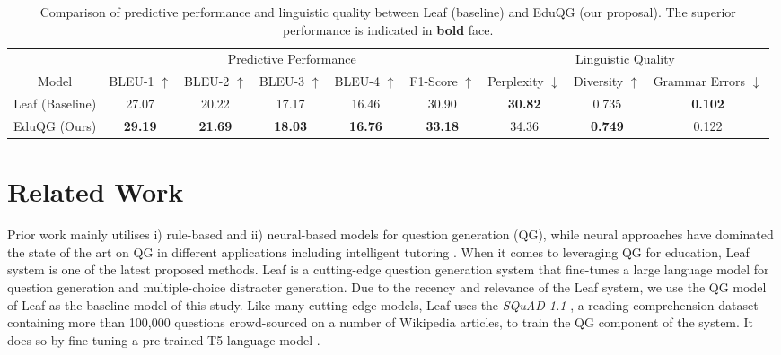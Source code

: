 \documentclass[letterpaper]{article} %
\begin{document}
\begin{table}[t!] \centering \small
\begin{tabular}{c|ccccc|ccc}
\hline
                & \multicolumn{5}{c}{Predictive Performance}                          & \multicolumn{3}{c}{Linguistic Quality}       \\
Model           & BLEU-1 $\uparrow$     & BLEU-2 $\uparrow$     & BLEU-3 $\uparrow$     & BLEU-4   $\uparrow$   & F1-Score  $\uparrow$        & Perplexity $\downarrow$       & Diversity $\uparrow$         & Grammar Errors $\downarrow$        \\

\hline
Leaf (Baseline) & 27.07          & 20.22          & 17.17          & {16.46} & 30.90          & \textbf{30.82} & 0.735          & \textbf{0.102} \\
EduQG (Ours)        & \textbf{29.19} & \textbf{21.69} & \textbf{18.03} & \textbf{16.76} & \textbf{33.18} & 34.36          & \textbf{0.749} & 0.122  \\       
\hline
\end{tabular}
\caption{Comparison of predictive performance and linguistic quality between Leaf (baseline) and EduQG (our proposal). The superior performance is indicated in \textbf{bold} face.}
\label{results}
\end{table}
\section{Related Work}

Prior work mainly utilises i) rule-based and ii) neural-based models for question generation (QG), while neural approaches have dominated the state of the art on QG in different applications including intelligent tutoring \cite{zhang2021review}. 
When it comes to leveraging QG for education, Leaf system \cite{vachev2022leaf} is one of the latest proposed methods.
Leaf is a cutting-edge question generation system that fine-tunes a large language model for question generation and multiple-choice distracter generation. Due to the recency and relevance of the Leaf system, we use the QG model of Leaf as the baseline model of this study.
Like many cutting-edge models, Leaf uses the \emph{SQuAD 1.1} \cite{DBLP:rajpurkar2016squad}, a reading comprehension dataset containing more than 100,000 questions crowd-sourced on a number of Wikipedia articles, to train the QG component of the system. It does so by fine-tuning a pre-trained T5 language model \cite{raffel2020exploring}. 
 
\end{document}
